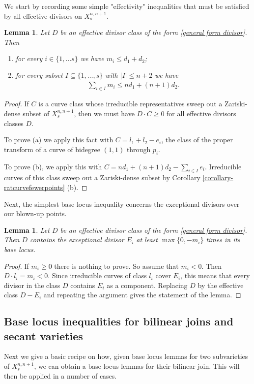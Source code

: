 \documentclass[a4paper,11pt]{article}
\newtheorem{lemma}[theorem]{Lemma}
\newcommand{\ourproductblowup}[1]{X^{n,n+1}_{#1}}
\begin{document}
We start by recording some simple "effectivity" inequalities that must be satisfied by all effective divisors on $\ourproductblowup{s}$.
\begin{lemma}\label{lemma-effectivityinequality}
Let $D$ be an effective divisor class of the form \eqref{general form divisor}. Then 
\begin{enumerate}
    \item[(a)] for every $i \in \{1,\ldots s\}$ we have $m_i \leq d_1+d_2$;
    \item[(b)] for every subset $I \subseteq \{1,\ldots,s\}$ with $|I|\leq n+2$ we have
\begin{align*}
    \sum_{i \in I} m_i \leq nd_1+(n+1)d_2.
\end{align*}
\end{enumerate}
\end{lemma}
\begin{proof}
If $C$ is a curve class whose irreducible representatives sweep out a Zariski-dense subset of $\ourproductblowup{s}$, then we must have $D \cdot C \geq 0$ for all effective divisors classes $D$.

To prove (a) we apply this fact with $C=l_1+l_2-e_i$, the class of the proper transform of a curve of bidegree $(1,1)$ through $p_i$. 

To prove (b), we apply this with $C=nd_1+(n+1)d_2-\sum_{i \in I} e_i$. Irreducible curves of this class sweep out a Zariski-dense subset by Corollary \ref{corollary-ratcurvefewerpoints} (b).
\end{proof}
Next, the simplest base locus inequality concerns the exceptional divisors over our blown-up points.
\begin{lemma}\label{bli-exceptional}
Let $D$ be an effective divisor class of the form \eqref{general form divisor}. Then $D$ contains the exceptional divisor $E_i$ at least $\max\{0,-m_i\}$ times in its base locus.
\end{lemma}
\begin{proof}
If $m_i \geq 0$ there is nothing to prove. So assume that $m_i<0$. Then $D \cdot l_i =m_i <0$. Since irreducible curves of class $l_i$ cover $E_i$, this means that every divisor in the class $D$ contains $E_i$ as a component. Replacing $D$ by the effective class $D-E_i$ and repeating the argument gives the statement of the lemma.
\end{proof}


\subsection{Base locus inequalities for bilinear joins and secant varieties}
Next we give a basic recipe on how, given base locus lemmas for two subvarieties of $\ourproductblowup{s}$, we can obtain a base locus lemmas for their bilinear join. This will then be applied in a number of cases.
\end{document}
